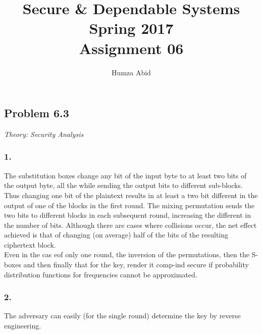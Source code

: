 \documentclass[a4paper]{article}
\begin{document}
	
	\title{Secure \& Dependable Systems \\  Spring 2017 \\ Assignment 06}
	\author{Humza Abid}
	\maketitle
	
	\subsection*{Problem 6.3} \textit{Theory: Security Analysis}
	\subsubsection*{1.} The substitution boxes change any bit of the input byte to at least two bits of the output byte, all the while sending the output bits to different sub-blocks. Thus changing one bit of the plaintext results in at least a two bit different in the output of one of the blocks in the first round. The mixing permutation sends the two bits to different blocks in each subsequent round, increasing the different in the number of bits. Although there are cases where collisions occur, the net effect achieved is that of changing (on average) half of the bits of the resulting ciphertext block. \\
	
	Even in the cas eof only one round, the inversion of the permutations, then the S-boxes and then finally that for the key, render it comp-ind secure if probability distribution functions for frequencies cannot be approximated. 
		
	\subsubsection*{2.} The adversary can easily (for the single round) determine the key by reverse engineering. 
 
	
	 
\end{document}
